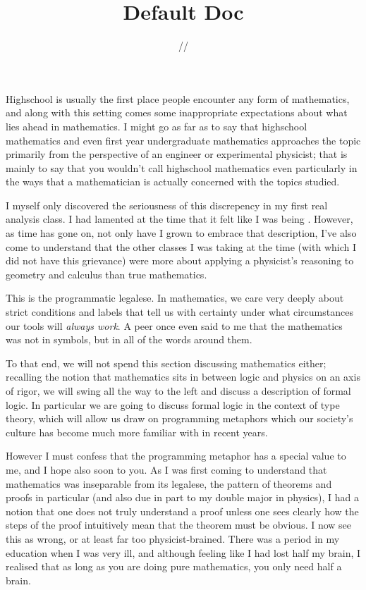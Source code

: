 \documentclass[11pt]{article}
\title{\textbf{Default Doc}}
\date{\the\day/\the\month/\the\year}
\begin{document}
Highschool is usually the first place people encounter any form of mathematics, and along with this setting comes some inappropriate expectations about what lies ahead in mathematics. I might go as far as to say that highschool mathematics and even first year undergraduate mathematics approaches the topic primarily from the perspective of an engineer or experimental physicist; that is mainly to say that you wouldn't call highschool mathematics even particularly  in the ways that a mathematician is actually concerned with the topics studied.

I myself only discovered the seriousness of this discrepency in my first real analysis class. I had lamented at the time that it felt like I was being . However, as time has gone on, not only have I grown to embrace that description, I've also come to understand that the other classes I was taking at the time (with which I did not have this grievance) were more about applying a physicist's reasoning to geometry and calculus than true mathematics.

This  is the programmatic legalese. In mathematics, we care very deeply about strict conditions and labels that tell us with certainty under what circumstances our tools will \emph{always work}. A peer once even said to me that the mathematics was not in symbols, but in all of the words around them.

To that end, we will not spend this section discussing mathematics either; recalling the notion that mathematics sits in between logic and physics on an axis of rigor, we will swing all the way to the left and discuss a description of formal logic. In particular we are going to discuss formal logic in the context of type theory, which will allow us draw on programming metaphors which our society's culture has become much more familiar with in recent years.

However I must confess that the programming metaphor has a special value to me, and I hope also soon to you. As I was first coming to understand that mathematics was inseparable from its legalese, the pattern of theorems and proofs in particular (and also due in part to my double major in physics), I had a notion that one does not truly understand a proof unless one sees clearly how the steps of the proof intuitively mean that the theorem must be obvious. I now see this as wrong, or at least far too physicist-brained. There was a period in my education when I was very ill, and although feeling like I had lost half my brain, I realised that as long as you are doing pure mathematics, you only need half a brain.
\end{document}
